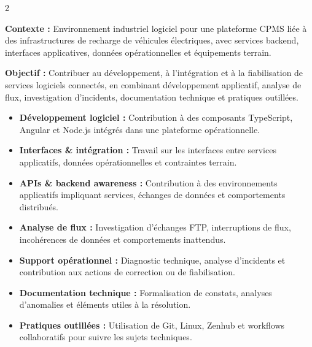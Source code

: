 \documentclass[8pt,a4paper,ragged2e,withhyper]{altacv}
\begin{document}



\makecvheader
\vspace{-0.3cm}


\begin{paracol}{2}



\textbf{Contexte :} Environnement industriel logiciel pour une plateforme CPMS liée à des infrastructures de recharge de véhicules électriques, avec services backend, interfaces applicatives, données opérationnelles et équipements terrain.

\textbf{Objectif :} Contribuer au développement, à l’intégration et à la fiabilisation de services logiciels connectés, en combinant développement applicatif, analyse de flux, investigation d’incidents, documentation technique et pratiques outillées.

\begin{itemize}
  \item \textbf{Développement logiciel :} Contribution à des composants TypeScript, Angular et Node.js intégrés dans une plateforme opérationnelle.
  \item \textbf{Interfaces \& intégration :} Travail sur les interfaces entre services applicatifs, données opérationnelles et contraintes terrain.
  \item \textbf{APIs \& backend awareness :} Contribution à des environnements applicatifs impliquant services, échanges de données et comportements distribués.
  \item \textbf{Analyse de flux :} Investigation d’échanges FTP, interruptions de flux, incohérences de données et comportements inattendus.
  \item \textbf{Support opérationnel :} Diagnostic technique, analyse d’incidents et contribution aux actions de correction ou de fiabilisation.
  \item \textbf{Documentation technique :} Formalisation de constats, analyses d’anomalies et éléments utiles à la résolution.
  \item \textbf{Pratiques outillées :} Utilisation de Git, Linux, Zenhub et workflows collaboratifs pour suivre les sujets techniques.
\end{itemize}


\end{paracol}
\end{document}
